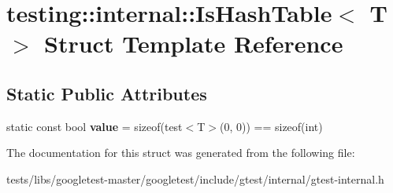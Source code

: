 \hypertarget{structtesting_1_1internal_1_1IsHashTable}{}\section{testing\+:\+:internal\+:\+:Is\+Hash\+Table$<$ T $>$ Struct Template Reference}
\label{structtesting_1_1internal_1_1IsHashTable}
\subsection*{Static Public Attributes}
\begin{DoxyCompactItemize}
\item 
\mbox{\label{structtesting_1_1internal_1_1IsHashTable_a165e0a3eddfa5fadf9b950be6432d848}} 
static const bool {\bfseries value} = sizeof(test$<$T$>$(0, 0)) == sizeof(int)
\end{DoxyCompactItemize}


The documentation for this struct was generated from the following file\+:\begin{DoxyCompactItemize}
\item 
tests/libs/googletest-\/master/googletest/include/gtest/internal/gtest-\/internal.\+h\end{DoxyCompactItemize}
